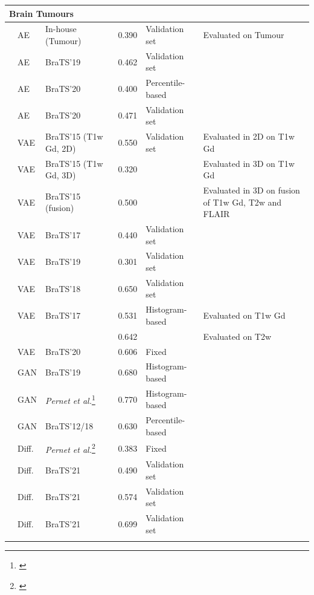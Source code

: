 \begin{longtable}{lp{1.2cm}lclp{5.5cm}}
\multicolumn{6}{l}{\textbf{Brain Tumours}} \\
\midrule
\citet{Baur2021-2} & AE & In-house (Tumour) & 0.390 & Validation set & Evaluated on Tumour\\
\citet{Luo2023} & AE & BraTS'19 & 0.462 & Validation set & \\
\citet{Meissen2023} & AE & BraTS'20 & 0.400 & Percentile-based & \\
\citet{Jimenez-Garcia2024} & AE & BraTS'20 & 0.471 & Validation set & \\
\citet{Uzunova2019} & VAE & BraTS'15 (T1w Gd, 2D) & 0.550 & Validation set & {Evaluated in 2D on T1w Gd}\\
\citet{Uzunova2019} & VAE & BraTS'15 (T1w Gd, 3D) & 0.320 &  & {Evaluated in 3D on T1w Gd}\\
\citet{Uzunova2019} & VAE & BraTS'15 (fusion) & 0.500 &  & {Evaluated in 3D on fusion of T1w Gd, T2w and FLAIR}\\
\citet{Zimmerer2019} & VAE & BraTS'17 & 0.440 & Validation set & \\
\citet{Bengs2021} & VAE & BraTS'19 & 0.301 & Validation set & \\
\citet{Lambert2021} & VAE & BraTS'18 & 0.650 & Validation set & \\
\citet{Chatterjee2022} & VAE & BraTS'17 & 0.531 & Histogram-based & {Evaluated on T1w Gd}\\
 & & & 0.642 & & {Evaluated on T2w}\\
\citet{Wijanarko2024} & VAE & BraTS'20 & 0.606 & Fixed & \\
\citet{Dey2021} & GAN & BraTS'19 & 0.680 & Histogram-based & \\
\citet{Nguyen2021} & GAN & \textit{Pernet et al.}\footnote{\citet{Pernet2016}} & 0.770 & Histogram-based & \\
\citet{Wu2021} & GAN & BraTS'12/18 & 0.630 & Percentile-based & \\
\citet{Wyatt2022} & Diff. & \textit{Pernet et al.}\footnote{\citet{Pernet2016}} & 0.383 & Fixed & \\
\citet{Behrendt2023} & Diff. & BraTS'21 & 0.490 & Validation set & \\
\citet{Behrendt2024} & Diff. & BraTS'21 & 0.574 & Validation set & \\
\citet{Fontanella2024} & Diff. & BraTS'21 & 0.699 & Validation set & \\
\addlinespace
\multicolumn{6}{l}{\textit{\small --- Studies using Retrospectively Optimized (Oracle) Thresholds ---}} \\

\end{longtable}
